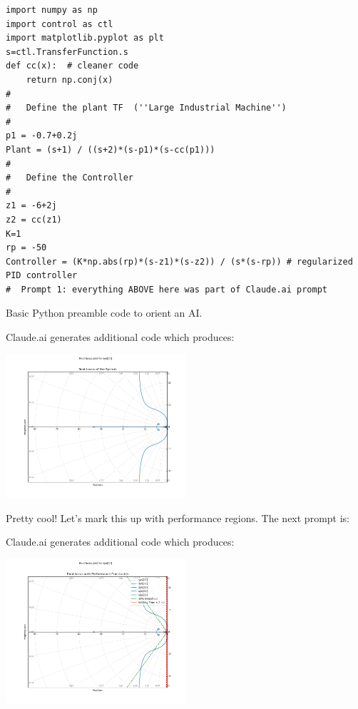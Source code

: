 \begin{listing}[b]
    \begin{verbatim}
import numpy as np
import control as ctl
import matplotlib.pyplot as plt
s=ctl.TransferFunction.s
def cc(x):  # cleaner code
    return np.conj(x)
#
#   Define the plant TF  (''Large Industrial Machine'')
#
p1 = -0.7+0.2j
Plant = (s+1) / ((s+2)*(s-p1)*(s-cc(p1)))
#
#   Define the Controller
#
z1 = -6+2j
z2 = cc(z1)
K=1
rp = -50
Controller = (K*np.abs(rp)*(s-z1)*(s-z2)) / (s*(s-rp)) # regularized PID controller
#  Prompt 1: everything ABOVE here was part of Claude.ai prompt
\end{verbatim}
  \caption{Basic Python preamble code to orient an AI.}
  \label{lstInitialAIPrompt}
\end{listing}

Claude.ai generates additional code which produces:

\includegraphics[width=0.5\textwidth]{figs09/ClaudeRL_V01.png}

Pretty cool!
Let's mark this up with performance regions.   The next prompt is:



Claude.ai generates additional code which produces:

\includegraphics[width=0.5\textwidth]{figs09/ClaudeRL_V02.png}

